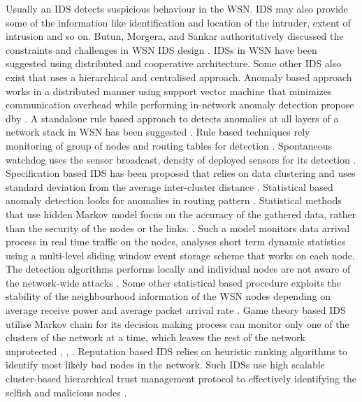 \documentclass[conference,final]{IEEEtran}
\begin{document}
Usually an IDS detects suspicious behaviour in the WSN.
IDS may also provide some of the information like identification and location of the intruder, extent of intrusion and so on.
Butun, Morgera, and Sankar authoritatively discussed the constraints and challenges in WSN IDS design \cite{6517052}.
IDSs in WSN have been suggested using distributed and cooperative architecture. 
Some other IDS also exist that  uses a  hierarchical and centralised approach.
Anomaly based approach works in a distributed manner using support vector machine that minimizes communication overhead while performing in-network anomaly detection propose dby \cite{ISI:000257882502160}.
A standalone rule based approach to detects anomalies at all layers of a network stack in WSN has been suggested \cite{ISI:000232429900067}.
Rule based  techniques rely  monitoring of group of nodes and routing tables for detection \cite{ISI:000298891500099, Chen:2009:NMI:1516241.1516282, 1424814, Strikos_afull}.
Spontaneous watchdog uses the sensor broadcast, density of deployed sensors for its detection \cite{1593102}.
Specification based  IDS has been proposed that relies on data clustering and uses standard deviation from the average inter-cluster distance \cite{Chen:2009:NMI:1516241.1516282, 1424814, Strikos_afull, 4085803}. 
Statistical based anomaly  detection looks for anomalies in routing pattern \cite{4024996}.
Statistical methods that use hidden Markov model focus on the accuracy of the gathered data, rather than the security of the nodes or the links.  \cite{1290173}.
Such a model monitors data arrival process in real time traffic on the nodes, analyses short term dynamic statistics using a multi-level sliding window event storage scheme that works on each node. The detection algorithms performs locally and individual nodes are not aware of the network-wide attacks \cite{1515559}.
Some other statistical based procedure exploits the stability of the neighbourhood information of the WSN nodes depending on average receive power and average packet arrival rate \cite{1512911}.
Game theory based IDS utilise Markov chain for its decision making process can monitor only one of the clusters of the network at a time, which leaves the rest of the network unprotected \cite{1347798}, \cite{Das07preventingdos}, \cite{Reddy:2009:GTA:1607720.1607944}.
Reputation based IDS relies on heuristic ranking algorithms to identify most likely bad nodes in the network.
Such IDSs use high scalable cluster-based hierarchical trust management protocol to effectively identifying the selfish and malicious nodes \cite{6174485}.
\end{document}
